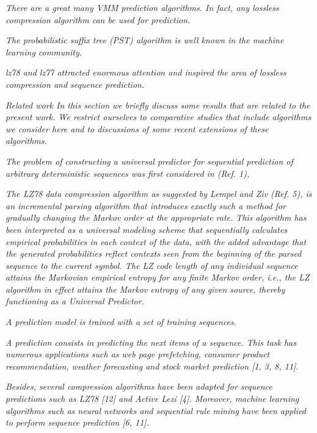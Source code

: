 


\emph{There are a great many VMM prediction algorithms. In fact, any lossless compression algorithm can be used for prediction.}~\cite{Begleiter2004} 

\emph{ The probabilistic suffix tree (PST) algorithm is well known in the machine learning community.}~\cite{Begleiter2004} 

\emph{lz78 and lz77 attracted enormous attention and inspired the area of lossless compression and sequence prediction.}~\cite{Begleiter2004} 


\emph{Related work
In this section we briefly discuss some results that are related to the present work. We restrict ourselves to comparative studies that include algorithms we consider here and to discussions of some recent extensions of these algorithms.}~\cite{Begleiter2004}

\emph{The problem of constructing a universal predictor for sequential prediction of arbitrary deterministic sequences was first considered in (Ref. 1),}~\cite{Gopalratnam2007}


\emph{The LZ78 data compression algorithm as suggested by Lempel and Ziv (Ref. 5), is an incremental parsing algorithm that introduces exactly such a method for gradually changing the Markov order at the appropriate rate. This algorithm has been interpreted as a universal modeling scheme that sequentially calculates empirical probabilities in each context of the data, with the added advantage that the generated probabilities reflect contexts seen from the beginning of the parsed sequence to the current symbol. The LZ code length of any individual sequence attains the Markovian empirical entropy for any finite Markov order, i.e., the LZ algorithm in effect attains the Markov entropy of any given source, thereby functioning as a Universal Predictor.}~\cite{Gopalratnam2007}


\emph{A prediction model is trained with a set of training sequences.}~\cite{Gueniche2015}

\emph{A prediction consists in predicting the next items of a sequence. This task has numerous applications such as web page prefetching, consumer product recommendation, weather forecasting and stock market prediction [1, 3, 8, 11].}~\cite{Gueniche2015}


\emph{Besides, several compression algorithms have been adapted for sequence predictions such as LZ78 [12] and Active Lezi [4]. Moreover, machine learning algorithms such as neural networks and sequential rule mining have been applied to perform sequence prediction [6, 11].}~\cite{Gueniche2015}


